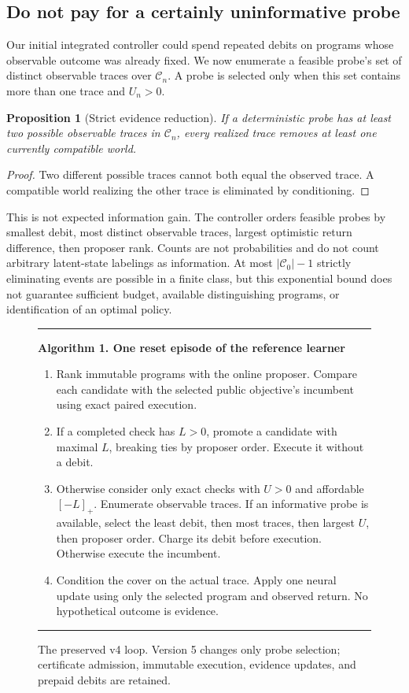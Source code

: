 \documentclass[10pt,twocolumn]{article}
\newtheorem{proposition}[theorem]{Proposition}
\newcommand{\C}{\mathcal C}
\begin{document}
\subsection{Do not pay for a certainly uninformative probe}
Our initial integrated controller could spend repeated debits on programs whose
observable outcome was already fixed. We now enumerate a feasible probe's set
of distinct observable traces over $\C_n$. A probe is selected only when this
set contains more than one trace and $U_n>0$.

\begin{proposition}[Strict evidence reduction]\label{prop:informative}
If a deterministic probe has at least two possible observable traces in
$\C_n$, every realized trace removes at least one currently compatible world.
\end{proposition}
\begin{proof}
Two different possible traces cannot both equal the observed trace. A compatible
world realizing the other trace is eliminated by conditioning.
\end{proof}

This is not expected information gain. The controller orders feasible probes by
smallest debit, most distinct observable traces, largest optimistic return
difference, then proposer rank. Counts are not probabilities and do not count
arbitrary latent-state labelings as information. At most $|\C_0|-1$ strictly
eliminating events are possible in a finite class, but this exponential bound
does not guarantee sufficient budget, available distinguishing programs, or
identification of an optimal policy.

\begin{figure}[t]
\small\hrule\medskip
\textbf{Algorithm 1. One reset episode of the reference learner}
\begin{enumerate}\setlength{\itemsep}{2pt}
\item Rank immutable programs with the online proposer. Compare each candidate
with the selected public objective's incumbent using exact paired execution.
\item If a completed check has $L>0$, promote a candidate with maximal $L$,
breaking ties by proposer order. Execute it without a debit.
\item Otherwise consider only exact checks with $U>0$ and affordable $[-L]_+$.
Enumerate observable traces. If an informative probe is available, select the
least debit, then most traces, then largest $U$, then proposer order. Charge its
debit before execution. Otherwise execute the incumbent.
\item Condition the cover on the actual trace. Apply one neural update using
only the selected program and observed return. No hypothetical outcome is evidence.
\end{enumerate}
\medskip\hrule
\caption{The preserved v4 loop. Version 5 changes only probe selection; certificate
admission, immutable execution, evidence updates, and prepaid debits are retained.}
\end{figure}
\end{document}
